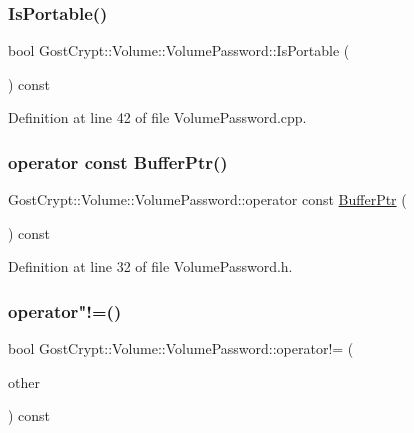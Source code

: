 \subsubsection{\texorpdfstring{Is\+Portable()}{IsPortable()}}
{\footnotesize\ttfamily bool Gost\+Crypt\+::\+Volume\+::\+Volume\+Password\+::\+Is\+Portable (\begin{DoxyParamCaption}{ }\end{DoxyParamCaption}) const}



Definition at line 42 of file Volume\+Password.\+cpp.

\mbox{\label{class_gost_crypt_1_1_volume_1_1_volume_password_a4276bf519df042dc771a762905043e5d}} 
\subsubsection{\texorpdfstring{operator const Buffer\+Ptr()}{operator const BufferPtr()}}
{\footnotesize\ttfamily Gost\+Crypt\+::\+Volume\+::\+Volume\+Password\+::operator const \hyperlink{class_gost_crypt_1_1_buffer_ptr}{Buffer\+Ptr} (\begin{DoxyParamCaption}{ }\end{DoxyParamCaption}) const\hspace{0.3cm}{\ttfamily [inline]}}



Definition at line 32 of file Volume\+Password.\+h.

\mbox{\label{class_gost_crypt_1_1_volume_1_1_volume_password_a13a3132f31b5470d5cabe91fa22c4e1c}} 
\subsubsection{\texorpdfstring{operator"!=()}{operator!=()}}
{\footnotesize\ttfamily bool Gost\+Crypt\+::\+Volume\+::\+Volume\+Password\+::operator!= (\begin{DoxyParamCaption}\item[{const \hyperlink{class_gost_crypt_1_1_volume_1_1_volume_password}{Volume\+Password} \&}]{other }\end{DoxyParamCaption}) const\hspace{0.3cm}{\ttfamily [inline]}}



